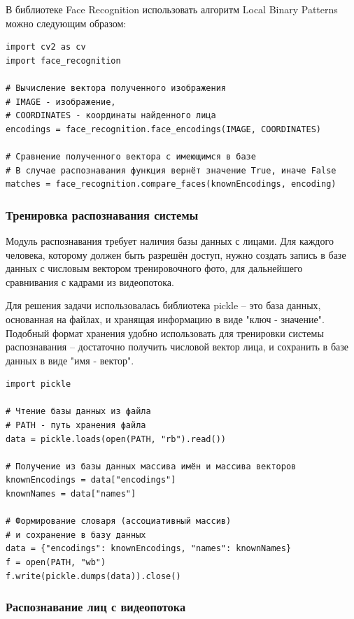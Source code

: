 В библиотеке Face Recognition использовать алгоритм Local Binary Patterns можно следующим
образом:

\begin{lstlisting}
import cv2 as cv
import face_recognition

# Вычисление вектора полученного изображения
# IMAGE - изображение, 
# COORDINATES - координаты найденного лица
encodings = face_recognition.face_encodings(IMAGE, COORDINATES)

# Сравнение полученного вектора с имеющимся в базе
# В случае распознавания функция вернёт значение True, иначе False
matches = face_recognition.compare_faces(knownEncodings, encoding)
\end{lstlisting}

\subsubsection{Тренировка распознавания системы}

Модуль распознавания требует наличия базы данных с лицами. Для каждого
человека, которому должен быть разрешён доступ, нужно создать запись в базе
данных с числовым вектором тренировочного фото, для дальнейшего сравнивания
с кадрами из видеопотока. 

Для решения задачи использовалась библиотека pickle \cite{pickle} -- это база данных,
основанная на файлах, и хранящая информацию в виде "ключ - значение". Подобный
формат хранения удобно использовать для тренировки системы распознавания --
достаточно получить числовой вектор лица, и сохранить в базе данных в виде "имя
- вектор". 

\begin{lstlisting}
import pickle

# Чтение базы данных из файла
# PATH - путь хранения файла
data = pickle.loads(open(PATH, "rb").read())

# Получение из базы данных массива имён и массива векторов
knownEncodings = data["encodings"]
knownNames = data["names"]

# Формирование словаря (ассоциативный массив)
# и сохранение в базу данных
data = {"encodings": knownEncodings, "names": knownNames}
f = open(PATH, "wb")
f.write(pickle.dumps(data)).close()
\end{lstlisting}

\subsubsection{Распознавание лиц с видеопотока}

